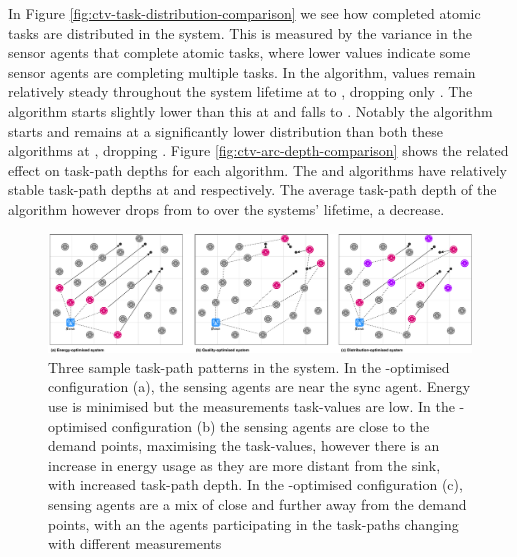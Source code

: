 In Figure \ref{fig:ctv-task-distribution-comparison} we see how completed atomic tasks are distributed in the system. This is measured by the variance in the sensor agents that complete atomic tasks, where lower values indicate some sensor agents are completing multiple tasks. In the \algorithmDistribution{}{} algorithm, values remain relatively steady throughout the system lifetime at \resultsTaskDistDistStart{}{} to \resultsTaskDistDistEnd{}{}, dropping only \resultsTaskDistDistPercent{}{}. The \algorithmQuality{}{} algorithm starts slightly lower than this at \resultsTaskDistQualityStart{}{} and falls \resultsTaskDistQualityPercent{}{} to \resultsTaskDistQualityEnd{}{}. Notably the \algorithmEnergy{}{} algorithm starts and remains at a significantly lower distribution than both these algorithms at \resultsTaskDistEnergyEnd{}{}, dropping \resultsTaskDistEnergydPercent{}{}. Figure
\ref{fig:ctv-arc-depth-comparison} shows the related effect on task-path depths for each algorithm. The \algorithmQuality{}{} and \algorithmDistribution{}{} algorithms have relatively stable task-path depths at \resultsArcDepthQualityEnd{}{} and \resultsArcDepthDistEnd{}{} respectively. The average task-path depth of the \algorithmEnergy{}{} algorithm however drops from \resultsArcDepthEnergyStart{}{} to  \resultsArcDepthEnergyEnd{}{} over the systems' lifetime, a \resultsArcDepthEnergyPercent{}{} decrease.

\begin{figure}
	\centering
	\includegraphics[width=1.0\linewidth]{result-types}
	\caption{Three sample task-path patterns in the \simulationExtended{}{} system. In the \algorithmEnergy{}{}-optimised configuration (a), the sensing agents are near the sync agent. Energy use is minimised but the measurements task-values are low. In the \algorithmQuality{}{}-optimised configuration (b) the sensing agents are close to the demand points, maximising the task-values, however there is an increase in energy usage as they are more distant from the sink, with increased task-path depth. In the \algorithmDistribution{}{}-optimised configuration (c), sensing agents are a mix of close and further away from the demand points, with an the agents participating in the task-paths changing with different measurements}
	\label{fig:result-types}
\end{figure} 

